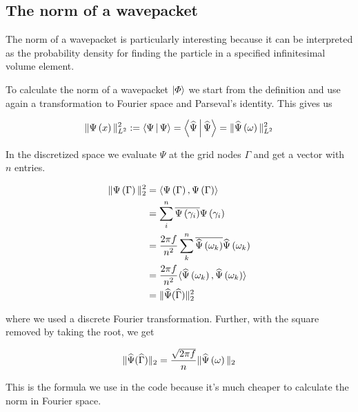 \subsection{The norm of a wavepacket}

The norm of a wavepacket is particularly interesting because it can be interpreted
as the probability density for finding the particle in a specified infinitesimal volume
element.

To calculate the norm of a wavepacket $\Ket{\varPhi}$ we start from the definition
and use again a transformation to Fourier space and Parseval's identity. This gives us

\begin{equation}
  \| \Psi\left( x \right) \|_{L^2}^2 := \Braket{\Psi | \Psi}
  = \Braket{\widehat{\Psi} | \widehat{\Psi}}
  = \| \widehat{\Psi}\left( \omega \right) \|_{L^2}^2
\end{equation}

In the discretized space we evaluate $\Psi$ at the grid nodes $\Gamma$ and get a vector with
$n$ entries.

\begin{equation}
\begin{split}
  \| \Psi\left( \Gamma \right) \|_{2}^2 & = \langle \Psi\left( \Gamma \right) , \Psi\left( \Gamma \right) \rangle \\
                               & = \sum_i^n \overline{\Psi\left( \gamma_i \right)} \Psi\left( \gamma_i \right) \\
                               & = \frac{2 \pi f}{n^2} \sum_k^n \overline{\widehat{\Psi}\left( \omega_k \right)} \widehat{\Psi}\left( \omega_k \right) \\
                               & = \frac{2 \pi f}{n^2} \langle \widehat{\Psi}\left( \omega_k \right) , \widehat{\Psi}\left( \omega_k \right) \rangle \\
                               & = \| \widehat{\Psi}(\widehat{\Gamma}) \|_{2}^2
\end{split}
\end{equation}

where we used a discrete Fourier transformation.
Further, with the square removed by taking the root, we get

\begin{equation}
  \| \widehat{\Psi}(\widehat{\Gamma}) \|_{2}
  = \frac{\sqrt{2 \pi f}}{n} \| \widehat{\Psi}\left( \omega \right) \|_{2}
\end{equation}

This is the formula we use in the code because it's much cheaper to calculate the
norm in Fourier space.

